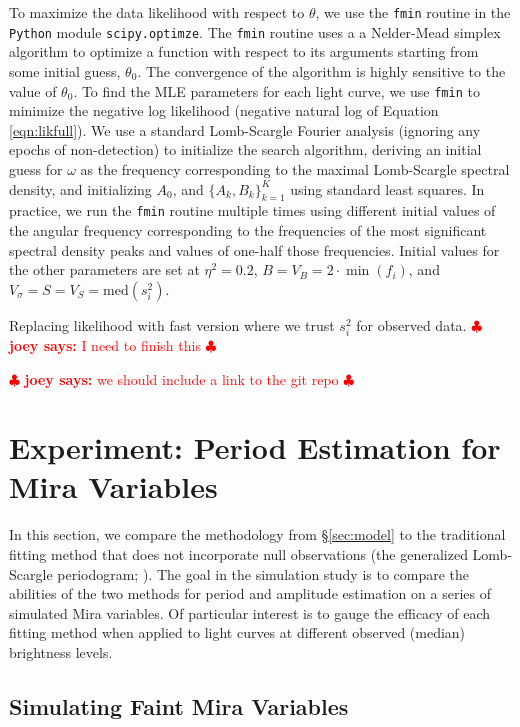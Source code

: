 \documentclass[12pt,preprint]{aastex}
\newcommand{\fobs}{f_i}
\newcommand{\sobs}{s^2_i}
\newcommand{\joey}[1] { \textcolor{red} {
\ensuremath{\clubsuit} {\bf joey says:}  {#1}
\ensuremath{\clubsuit} } }%
\begin{document}
To maximize the data likelihood with respect to $\theta$, we use the {\tt fmin} routine in the {\tt Python} module {\tt scipy.optimze}.  The {\tt fmin} routine uses a a Nelder-Mead simplex algorithm to optimize a function with respect to its arguments starting from some initial guess, $\theta_0$.  The convergence of the algorithm is highly sensitive to the value of $\theta_0$.  To find the MLE parameters for each light curve, we use {\tt fmin} to minimize the negative log likelihood (negative natural log of Equation \ref{eqn:likfull}).  We use a standard Lomb-Scargle Fourier analysis (ignoring any epochs of non-detection) to initialize the search algorithm, deriving an initial guess for $\omega$ as the frequency corresponding to the maximal Lomb-Scargle spectral density, and initializing $A_0$, and $\{A_k, B_k\}_{k=1}^K$ using standard least squares.  In practice, we run the {\tt fmin} routine multiple times using different initial values of the angular frequency corresponding to the frequencies of the most significant spectral density peaks and values of one-half those frequencies.  Initial values for the other parameters are set at $\eta^2 = 0.2$, $B = V_B = 2\cdot\min(\fobs)$, and $ V_{\sigma} = S = V_S = \textrm{med}(\sobs)$.



Replacing likelihood with fast version where we trust $s_i^2$ for observed data. \joey{I need to finish this}


\joey{we should include a link to the git repo}



\section{Experiment: Period Estimation for Mira Variables}
\label{sec:experiments}

In this section, we compare  the methodology from \S\ref{sec:model} to the traditional fitting method that does not incorporate null observations (the generalized Lomb-Scargle periodogram; \citealt{1976lomb, 1982scar, zech09}).  The goal in the simulation study is to compare the abilities of the two methods for period and amplitude estimation on a series of simulated Mira variables.  Of particular interest is to gauge the efficacy of each fitting method when applied to light curves at different observed (median) brightness levels.


\subsection{Simulating Faint Mira Variables}
\label{ss:mirasim}
\end{document}
